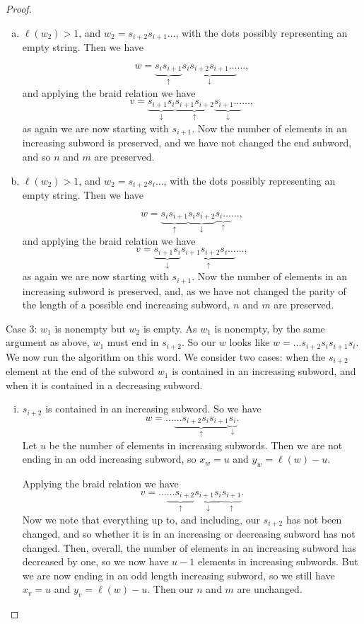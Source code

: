 \documentclass[11pt]{article}
\begin{document}
\begin{proof}
\begin{enumerate}[(a)]
        \item $\ell(w_2)>1$, and $w_2=s_{i+2}s_{i+1}\hdots$, with the dots possibly representing an empty string. Then we have
        
        \[w=\underbrace{s_is_{i+1}}_\uparrow \underbrace{s_is_{i+2}s_{i+1}\hdots}_\downarrow\hdots,\]
        and applying the braid relation we have
        \[v=\underbrace{s_{i+1}s_i}_\downarrow \underbrace{s_{i+1}s_{i+2}}_\uparrow\underbrace{s_{i+1}\hdots}_\downarrow\hdots,\]
        as again we are now starting with $s_{i+1}$. Now the number of elements in an increasing subword is preserved, and we have not changed the end subword, and so $n$ and $m$ are preserved.
        \item $\ell(w_2)>1$, and $w_2=s_{i+2}s_i\hdots$, with the dots possibly representing an empty string. Then we have
        
        \[w=\underbrace{s_is_{i+1}}_\uparrow \underbrace{s_is_{i+2}}_\downarrow\underbrace{s_i\hdots}_\uparrow\hdots,\]
        and applying the braid relation we have
        \[v=\underbrace{s_{i+1}s_i}_\downarrow \underbrace{s_{i+1}s_{i+2}s_i\hdots}_\uparrow\hdots,\]
        as again we are now starting with $s_{i+1}$. Now the number of elements in an increasing subword is preserved, and, as we have not changed the parity of the length of a possible end increasing subword, $n$ and $m$ are preserved.
    \end{enumerate}
    Case 3: $w_1$ is nonempty but $w_2$ is empty. As $w_1$ is nonempty,  by the same argument as above, $w_1$ must end in $s_{i+2}$. So our $w$ looks like $w=\hdots s_{i+2}s_is_{i+1}s_i$. We now run the algorithm on this word. We consider two cases: when the $s_{i+2}$ element at the end of the subword $w_1$ is contained in an increasing subword, and when it is contained in a decreasing subword. 
\begin{enumerate}[(i)]
        \item $s_{i+2}$ is contained in an increasing subword. So we have
    \[w=\hdots\underbrace{\hdots s_{i+2}s_is_{i+1}}_\uparrow \underbrace{s_i}_\downarrow.\]
    Let $u$ be the number of elements in increasing subwords. Then we are not ending in an odd increasing subword, so $x_w=u$ and $y_w=\ell(w)-u$.
    
    Applying the braid relation we have 
    \[v=\hdots\underbrace{\hdots s_{i+2}}_\uparrow \underbrace{s_{i+1}s_i}_\downarrow \underbrace{s_{i+1}}_\uparrow.\]
    Now we note that everything up to, and including, our $s_{i+2}$ has not been changed, and so whether it is in an increasing or decreasing subword has not changed. Then, overall, the number of elements in an increasing subword has decreased by one, so we now have $u-1$ elements in increasing subwords. But we are now ending in an odd length increasing subword, so we still have $x_v=u$ and $y_v=\ell(w)-u$. Then our $n$ and $m$ are unchanged. 


\end{enumerate}
\end{proof}
\end{document}
